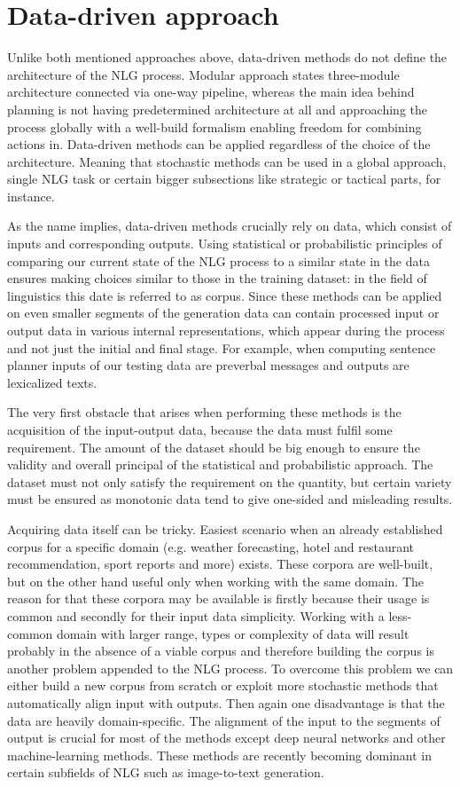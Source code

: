 \section{Data-driven approach}
Unlike both mentioned approaches above, data-driven methods do not define the architecture of the NLG process. Modular approach states three-module architecture connected via one-way pipeline, whereas the main idea behind planning is not having predetermined architecture at all and approaching the process globally with a well-build formalism enabling freedom for combining actions in. Data-driven methods can be applied regardless of the choice of the architecture. Meaning that stochastic methods can be used in a global approach, single NLG task or certain bigger subsections like strategic or tactical parts, for instance.

As the name implies, data-driven methods crucially rely on data, which consist of inputs and corresponding outputs. Using statistical or probabilistic principles of comparing our current state of the NLG process to a similar state in the data ensures making choices similar to those in the training dataset: in the field of linguistics this date is referred to as corpus. Since these methods can be applied on even smaller segments of the generation data can contain processed input or output data in various internal representations, which appear during the process and not just the initial and final stage. For example, when computing sentence planner inputs of our testing data are preverbal messages and outputs are lexicalized texts.

The very first obstacle that arises when performing these methods is the acquisition of the input-output data, because the data must fulfil some requirement. The amount of the dataset should be big enough to ensure the validity and overall principal of the statistical and probabilistic approach. The dataset must not only satisfy the requirement on the quantity, but certain variety must be ensured as monotonic data tend to give one-sided and misleading results. 

Acquiring data itself can be tricky. Easiest scenario when an already established corpus for a specific domain (e.g. weather forecasting, hotel and restaurant recommendation, sport reports and more) exists. These corpora are well-built, but on the other hand useful only when working with the same domain. The reason for that these corpora may be available is firstly because their usage is common and secondly for their input data simplicity. Working with a less-common domain with larger range, types or complexity of data will result probably in the absence of a viable corpus and therefore building the corpus is another problem appended to the NLG process. To overcome this problem we can either build a new corpus from scratch or exploit more stochastic methods that automatically align input with outputs. Then again one disadvantage is that the data are heavily domain-specific. The alignment of the input to the segments of output is crucial for most of the methods except deep neural networks and other machine-learning methods. These methods are recently becoming dominant in certain subfields of NLG such as image-to-text generation.

